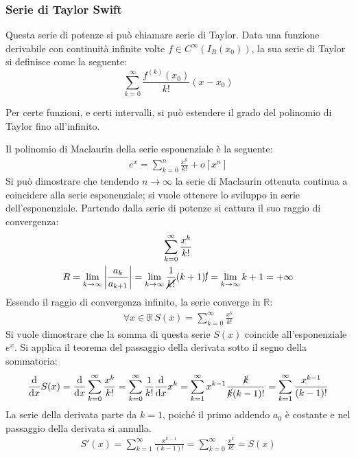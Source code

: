\documentclass{article}
\numberwithin{equation}{subsection}
\begin{document}
\subsubsection{Serie di Taylor Swift}

Questa serie di potenze si può chiamare serie di Taylor. Data una funzione derivabile con continuità infinite volte $f\in C^\infty(I_R(x_0)) $, la sua serie di Taylor si definisce come la seguente:
\begin{equation}
    \displaystyle\sum_{k=0}^\infty\frac{f^{(k)}(x_0)}{k!}(x-x_0)
\end{equation}

Per certe funzioni, e certi intervalli, si può estendere il grado del polinomio di Taylor fino all'infinito. 

Il polinomio di Maclaurin della serie esponenziale è la seguente:
\begin{gather*}
    e^x=\displaystyle\sum_{k=0}^n\frac{x^k}{k!}+o[x^n]
\end{gather*}
Si può dimostrare che tendendo $n\to\infty$ la serie di Maclaurin ottenuta continua a coincidere alla serie esponenziale; si vuole ottenere lo sviluppo in serie dell'esponenziale. 
Partendo dalla serie di potenze si cattura il suo raggio di convergenza:
\begin{gather*}
    \displaystyle\sum_{k=0}^\infty\frac{x^k}{k!}\\
    R=\lim_{k\to\infty}\displaystyle\left|\frac{a_k}{a_{k+1}}\right|=
    \lim_{k\to\infty}\frac{1}{\cancel{k!}}(k+1)\cancel{!}=\lim_{k\to\infty}{k+1}=+\infty
\end{gather*}
Essendo il raggio di convergenza infinito, la serie converge in $\mathbb{R}$:
\begin{gather*}
    \forall x\in\mathbb{R}\, S(x)=\displaystyle\sum_{k=0}^\infty\frac{x^k}{k!}
\end{gather*}
Si vuole dimostrare che la somma di questa serie $S(x)$ coincide all'esponenziale $e^x$. Si applica il teorema del passaggio della derivata sotto il segno della sommatoria:
\begin{gather*}
    \displaystyle\frac{\mathrm{d}}{\mathrm{d}x}S(x)=\frac{\mathrm{d}}{\mathrm{d}x}\sum_{k=0}^\infty\frac{x^k}{k!}=
    \displaystyle\sum_{k=0}^\infty\frac{1}{k!}\frac{\mathrm{d}}{\mathrm{d}x}x^k=
    \sum_{k=1}^\infty x^{k-1}\frac{\cancel{k}}{\cancel{k}(k-1)!}=
    \displaystyle\sum_{k=1}^\infty\frac{x^{k-1}}{(k-1)!}\\
\end{gather*}
La serie della derivata parte da $k=1$, poiché il primo addendo $a_0$ è costante e nel passaggio della derivata si annulla. 
\begin{gather*}
    S'(x)=\displaystyle\sum_{k=1}^\infty\frac{x^{k-1}}{(k-1)!}=
    \displaystyle\sum_{k=0}^\infty\frac{x^{k}}{k!}=S(x)
\end{gather*}
\end{document}
